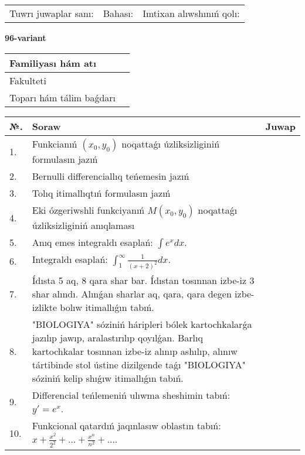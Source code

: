 \documentclass{article}
\begin{document}
\vspace{1cm}

\begin{tabular}{ c c c }
Tuwrı juwaplar sanı: \underline{\hspace{2cm}} & Bahası: \underline{\hspace{2cm}} & Imtixan alıwshınıń qolı: \underline{\hspace{2cm}} \\
\end{tabular}

\newpage

\begin{center}\textbf{96-variant}\end{center}

\bgroup
\def\arraystretch{1.5}
\begin{tabular}{ |m{6cm}|m{10cm}| }
  \hline
  Familiyası hám atı & \\
  \hline
  Fakulteti &\\
  \hline
  Toparı hám tálim baǵdarı & \\
  \hline
\end{tabular}
\egroup

\vspace{0.5cm}

\bgroup
\def\arraystretch{2}
\begin{tabular}{ |l|m{8cm}|m{7cm}| }
  \hline
  №. & Soraw & Juwap \\
  \hline
  1. & Funkcianıń $(x_{0}, y_{0})$ noqattaǵı úzliksizliginiń formulasın jazıń &  \\
  \hline
  2. & Bernulli differenciallıq teńemesin jazıń &  \\
  \hline
  3. & Tolıq itimallıqtıń formulasın jazıń &  \\
  \hline
  4. & Eki ózgeriwshli funkciyanıń $M(x_{0} , y_{0})$ noqattaǵı úzliksizliginiń anıqlaması &  \\
  \hline
  5. & Anıq emes integraldı esaplań: $\displaystyle\int e^{x}dx$. &  \\
  \hline
  6. & Integraldı esaplań: $\displaystyle\int_{1}^{\infty}{\frac{1}{\left( x + 2 \right)^{2}}dx }$. &  \\
  \hline
  7. & Ídısta 5 aq, 8 qara shar bar. Ídıstan tosınnan izbe-iz 3 shar alındı. Alınǵan sharlar aq, qara, qara degen izbe-izlikte bolıw itimallıǵın tabıń. &  \\
  \hline
  8. & "BIOLOGIYA" sóziniń háripleri bólek kartochkalarǵa jazılıp jawıp, aralastırılıp qoyılǵan. Barlıq kartochkalar tosınnan izbe-iz alınıp ashılıp, alınıw tártibinde stol ústine dizilgende taǵı "BIOLOGIYA" sóziniń kelip shıǵıw itimallıǵın tabıń. &  \\
  \hline
  9. & Differencial teńlemeniń ulıwma sheshimin tabıń: $y'=e^{x}$. &  \\
  \hline
  10. & Funkcional qatardıń jaqınlasıw oblastın tabıń: $\displaystyle x + \frac{x^{2}}{2^{2}} + \ldots + \frac{x^{n}}{n^{2}} + \ldots$. &  \\
  \hline
\end{tabular}
\egroup
\end{document}
